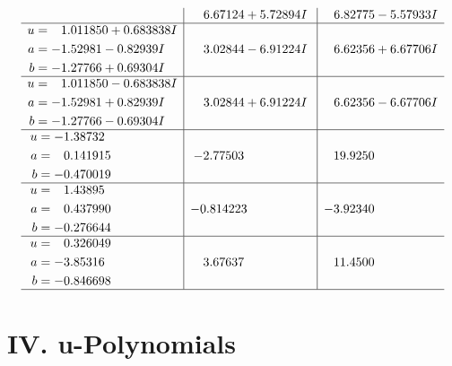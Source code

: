 \documentclass[1p]{elsarticle_modified}
\theoremstyle{definition}
\begin{document}
$$\begin{array}{c|c|c}
 & \phantom{-}6.67124 + 5.72894 I & \phantom{-}6.82775 - 5.57933 I \\ \hline\begin{aligned}
u &= \phantom{-}1.011850 + 0.683838 I \\
a &= -1.52981 - 0.82939 I \\
b &= -1.27766 + 0.69304 I\end{aligned}
 & \phantom{-}3.02844 - 6.91224 I & \phantom{-}6.62356 + 6.67706 I \\ \hline\begin{aligned}
u &= \phantom{-}1.011850 - 0.683838 I \\
a &= -1.52981 + 0.82939 I \\
b &= -1.27766 - 0.69304 I\end{aligned}
 & \phantom{-}3.02844 + 6.91224 I & \phantom{-}6.62356 - 6.67706 I \\ \hline\begin{aligned}
u &= -1.38732\phantom{ +0.000000I} \\
a &= \phantom{-}0.141915\phantom{ +0.000000I} \\
b &= -0.470019\phantom{ +0.000000I}\end{aligned}
 & -2.77503\phantom{ +0.000000I} & \phantom{-}19.9250\phantom{ +0.000000I} \\ \hline\begin{aligned}
u &= \phantom{-}1.43895\phantom{ +0.000000I} \\
a &= \phantom{-}0.437990\phantom{ +0.000000I} \\
b &= -0.276644\phantom{ +0.000000I}\end{aligned}
 & -0.814223\phantom{ +0.000000I} & -3.92340\phantom{ +0.000000I} \\ \hline\begin{aligned}
u &= \phantom{-}0.326049\phantom{ +0.000000I} \\
a &= -3.85316\phantom{ +0.000000I} \\
b &= -0.846698\phantom{ +0.000000I}\end{aligned}
 & \phantom{-}3.67637\phantom{ +0.000000I} & \phantom{-}11.4500\phantom{ +0.000000I}\\
 \hline 
 \end{array}$$\newpage
\newpage\renewcommand{\arraystretch}{1}
\centering \section*{ IV. u-Polynomials}
\end{document}
